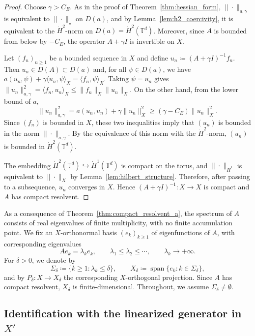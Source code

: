 \documentclass[11pt]{article}
\numberwithin{equation}{section}
\theoremstyle{definition}
\newcommand{\T}{\mathbb{T}}
\newcommand{\dotHk}[1][k]{\dot{H}^{#1}}
\begin{document}
\begin{proof}
    Choose $\gamma > C_E$.
    As in the proof of Theorem~\ref{thm:hessian_form}, $\|\cdot\|_{a,\gamma}$ is equivalent to $\|\cdot\|_\star$ on $D(a)$, and by Lemma~\ref{lem:h2_coercivity}, it is equivalent to the $\dotHk[2]$-norm on $D(a) = \dotHk[2](\T^d)$.
    Moreover, since $A$ is bounded from below by $-C_E$, the operator $A + \gamma I$ is invertible on $X$.

    Let $(f_n)_{n \ge 1}$ be a bounded sequence in $X$ and define $u_n \coloneqq (A + \gamma I)^{-1}f_n$.
    Then $u_n \in D(A) \subset D(a)$ and, for all $\psi \in D(a)$, we have $a(u_n, \psi) + \gamma\langle u_n, \psi\rangle_X = \langle f_n, \psi\rangle_X$.
    Taking $\psi = u_n$ gives $\|u_n\|_{a,\gamma}^2 = \langle f_n,u_n\rangle_X \le \|f_n\|_X \|u_n\|_X$.
    On the other hand, from the lower bound of $a$,
    \[
    \|u_n\|_{a,\gamma}^2 = a(u_n,u_n)+\gamma\|u_n\|_X^2 \ge (\gamma-C_E)\|u_n\|_X^2.
    \]
    Since $(f_n)$ is bounded in $X$, these two inequalities imply that $(u_n)$ is bounded in the norm $\|\cdot\|_{a, \gamma}$.
    By the equivalence of this norm with the $\dotHk[2]$-norm, $(u_n)$ is bounded in $\dotHk[2](\T^d)$.

    The embedding $\dotHk[2](\T^d) \hookrightarrow \dotHk[1](\T^d)$ is compact on the torus, and $\|\cdot\|_{\dotHk[1]}$ is equivalent to $\|\cdot\|_X$ by Lemma~\ref{lem:hilbert_structure}.
    Therefore, after passing to a subsequence, $u_n$ converges in $X$.
    Hence $(A+\gamma I)^{-1} : X \to X$ is compact and $A$ has compact resolvent.
\end{proof}

As a consequence of Theorem~\ref{thm:compact_resolvent_a}, the spectrum of $A$ consists of real eigenvalues of finite multiplicity, with no finite accumulation point.
We fix an $X$-orthonormal basis $(e_k)_{k \ge 1}$ of eigenfunctions of $A$, with corresponding eigenvalues
\[
A e_k = \lambda_k e_k, \qquad \lambda_1 \le \lambda_2 \le \cdots, \qquad \lambda_k \to+\infty.
\]
For $\delta > 0$, we denote by
\[
\Sigma_\delta \coloneqq \{k \ge 1 : \lambda_k \le \delta\}, \qquad X_\delta \coloneqq \operatorname{span}\{e_k : k \in \Sigma_\delta\},
\]
and by $P_\delta : X\to X_\delta$ the corresponding $X$-orthogonal projection. 
Since $A$ has compact resolvent, $X_\delta$ is finite-dimensional.
Throughout, we assume $\Sigma_\delta \neq \emptyset$.

\subsection{Identification with the linearized generator in \texorpdfstring{$X'$}{X'}}
\end{document}
